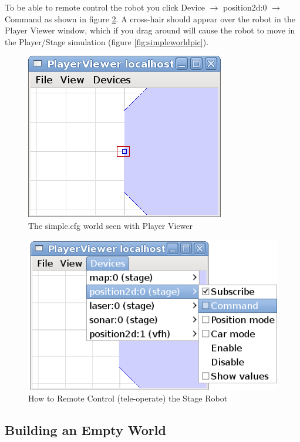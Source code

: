 \documentclass[a4paper]{report}
\newcommand{\plst}{Player/Stage\xspace}
\newcommand{\pl}{Player\xspace}
\begin{document}
To be able to remote control the robot you click Device $\rightarrow$ position2d:0 $\rightarrow$ Command as shown in figure \ref{fig:playerv_teleoperation}. A cross-hair should appear over the robot in the \pl Viewer window, which if you drag around will cause the robot to move in the \plst simulation (figure \ref{fig:simpleworldpic}).

\begin{figure}
	\centering
	\includegraphics[width=0.4\linewidth]{./pics/playerv_simpleworld.png}
	\caption{The simple.cfg world seen with \pl Viewer}
	\label{fig:playerv_simpleworldpic}
\end{figure}

\begin{figure}
	\centering
	\includegraphics[width=0.6\linewidth]{./pics/playerv_teleoperation.png}
	\caption{How to Remote Control (tele-operate) the Stage Robot}
	\label{fig:playerv_teleoperation}
\end{figure}



\subsection{Building an Empty World} \label{sec:emptyWorld}
\end{document}
